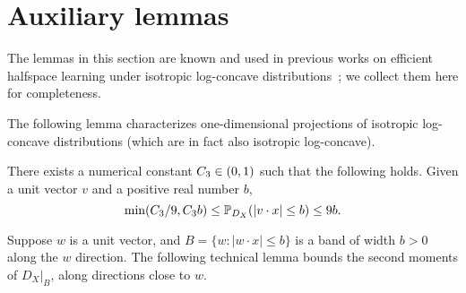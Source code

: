 
\section{Auxiliary lemmas}
The lemmas in this section are known and used in previous works on efficient halfspace learning under isotropic log-concave distributions~\citep[See e.g.][]{ABL17, ABHZ16}; we collect them here for completeness.

The following lemma characterizes one-dimensional projections of isotropic log-concave distributions (which are in fact also isotropic log-concave).
\begin{lemma}[\citet{LV07}]
There exists a numerical constant $C_3 \in (0,1)$ such that the following holds.
Given
a unit vector $v$ and a positive real number $b$,
\[ \min(C_3 /9, C_3  b) \leq \mathbb{P}_{D_X}(|v \cdot x| \leq b ) \leq 9 b. \]
\label{lem:bandmass}
\end{lemma}

Suppose $w$ is a unit vector, and $B = \{w: |w \cdot x| \leq b \}$ is a band of width
$b > 0$ along the $w$ direction.
The following technical lemma bounds the second moments of
$D_X|_B$, along directions close to $w$.

